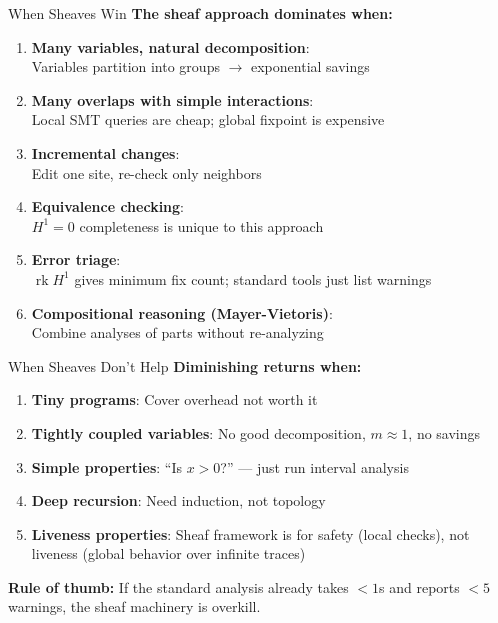 \documentclass[aspectratio=169,10pt]{beamer}
\newcommand{\rk}{\operatorname{rk}}
\begin{document}
\begin{frame}{When Sheaves Win}
\textbf{The sheaf approach dominates when:}

\begin{enumerate}
  \item \textbf{Many variables, natural decomposition}:\\
        Variables partition into groups $\to$ exponential savings
  \item \textbf{Many overlaps with simple interactions}:\\
        Local SMT queries are cheap; global fixpoint is expensive
  \item \textbf{Incremental changes}:\\
        Edit one site, re-check only neighbors
  \item \textbf{Equivalence checking}:\\
        $H^1 = 0$ completeness is unique to this approach
  \item \textbf{Error triage}:\\
        $\rk H^1$ gives minimum fix count; standard tools just list warnings
  \item \textbf{Compositional reasoning (Mayer-Vietoris)}:\\
        Combine analyses of parts without re-analyzing
\end{enumerate}
\end{frame}

\begin{frame}{When Sheaves Don't Help}
\textbf{Diminishing returns when:}

\begin{enumerate}
  \item \textbf{Tiny programs}: Cover overhead not worth it
  \item \textbf{Tightly coupled variables}: No good decomposition, $m \approx 1$, no savings
  \item \textbf{Simple properties}: ``Is $x > 0$?'' --- just run interval analysis
  \item \textbf{Deep recursion}: Need induction, not topology
  \item \textbf{Liveness properties}: Sheaf framework is for safety (local checks), not liveness (global behavior over infinite traces)
\end{enumerate}

\vspace{0.3em}
\textbf{Rule of thumb:} If the standard analysis already takes $<1$s and reports $<5$ warnings, the sheaf machinery is overkill.
\end{frame}
\end{document}
